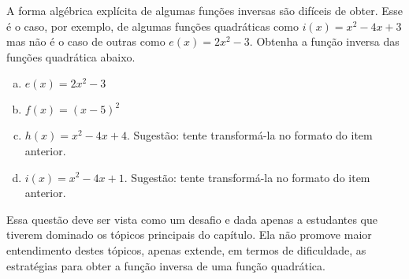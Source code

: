 \documentclass[main_estudante.tex]{subfiles}
\begin{document}
\begin{adicional}
A forma algébrica explícita de algumas funções inversas são difíceis de obter. Esse é o caso, por exemplo, de algumas funções quadráticas como $i(x)=x^2-4x+3$ mas não é o caso de outras como $e(x)=2x^2-3$. Obtenha a função inversa das funções quadrática abaixo.
\begin{enumerate}[a)]
\item $e(x)=2x^2-3$
\item $f(x)=(x-5)^2$
\item $h(x)=x^2-4x+4$. Sugestão: tente transformá-la no formato do item anterior.
\item $i(x)=x^2-4x+1$. Sugestão: tente transformá-la no formato do item anterior.
\end{enumerate}
\end{adicional}

Essa questão deve ser vista como um desafio e dada apenas a estudantes que tiverem dominado os tópicos principais do capítulo. Ela não promove maior entendimento destes tópicos, apenas extende, em termos de dificuldade, as estratégias para obter a função inversa de uma função quadrática.
\end{document}
